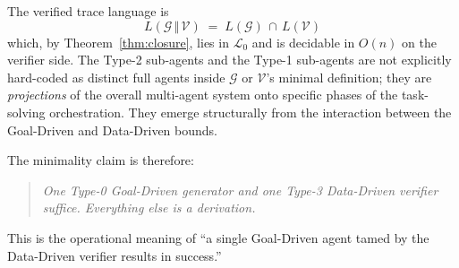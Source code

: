 The verified trace language is
\[
L(\mathcal{G}\,\Vert\,\mathcal{V})
\;=\; L(\mathcal{G}) \,\cap\, L(\mathcal{V})
\]
which, by Theorem~\ref{thm:closure}, lies in $\mathcal{L}_0$ and
is decidable in $O(n)$ on the verifier side.  The Type-2
sub-agents and the Type-1 sub-agents
are not explicitly hard-coded as distinct full agents inside
$\mathcal{G}$ or $\mathcal{V}$'s minimal definition; they are
\emph{projections} of the overall multi-agent system onto specific
phases of the task-solving orchestration. They emerge structurally
from the interaction between the Goal-Driven and Data-Driven bounds.

The minimality claim is therefore:
\begin{quote}
\emph{One Type-0 Goal-Driven generator and one Type-3
Data-Driven verifier suffice.  Everything else is a derivation.}
\end{quote}

This is the operational meaning of ``a single Goal-Driven agent
tamed by the Data-Driven verifier results in success.''
